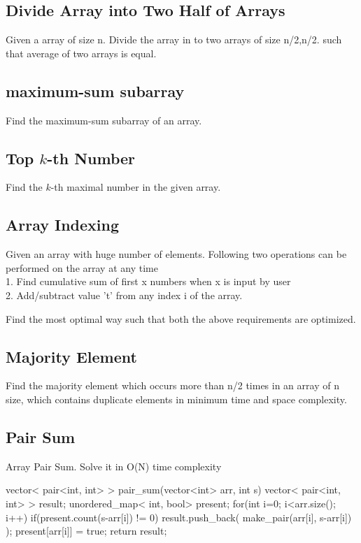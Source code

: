 \subsection{Divide Array into Two Half of Arrays}
Given a array of size n. Divide the array in to two arrays of size n/2,n/2. such that average of two arrays is equal.

\subsection{ maximum-sum subarray}
Find the maximum-sum subarray of an array.

\subsection{Top $k$-th Number}
Find the $k$-th maximal number in the given array.

\subsection{Array Indexing}
Given an array with huge number of elements. Following two operations can be performed on the array at any time\\
1. Find cumulative sum of first x numbers when x is input by user\\
2. Add/subtract value 't' from any index i of the array.

Find the most optimal way such that both the above requirements are optimized.

\subsection{Majority Element}
Find the majority element which occurs more than n/2 times in an array of n size, which contains duplicate elements in minimum time and space complexity.

\subsection{Pair Sum}
Array Pair Sum. Solve it in O(N) time complexity

\begin{Code}
    vector< pair<int, int> > pair_sum(vector<int> arr, int s){
    	vector< pair<int, int> > result;
    	unordered_map< int, bool> present;
    	for(int i=0; i<arr.size(); i++){
    		if(present.count(s-arr[i]) != 0)
    			result.push_back( make_pair(arr[i], s-arr[i]) );
    		present[arr[i]] = true;	
    	}
    	return result;
    }
\end{Code}

